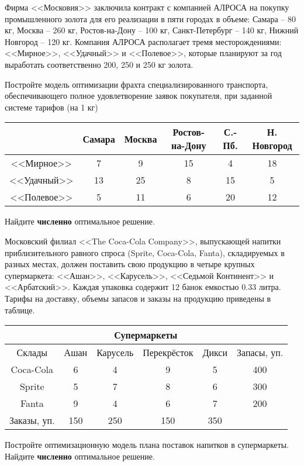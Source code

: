 \begin{exercise}%
Фирма <<Московия>> заключила контракт с компанией АЛРОСА на покупку
промышленного золота для его реализации в пяти городах в объеме:
Самара -- 80 кг, Москва -- 260 кг, Ростов-на-Дону -- 100 кг,
Санкт-Петербург -- 140 кг, Нижний Новгород -- 120 кг. Компания
АЛРОСА располагает тремя месторождениями: <<Мирное>>, <<Удачный>> и
<<Полевое>>, которые планируют за год выработать соответственно
200, 250 и 250 кг золота.

Постройте модель оптимизации фрахта специализированного транспорта,
обеспечивающего полное удовлетворение заявок покупателя, при
заданной системе тарифов (на 1 кг)
\begin{center}\small
	\begin{tabular}{|c|c|c|c|c|c|}
	\hline
	& Самара & Москва & Ростов-на-Дону & С.-Пб. & Н. Новгород \\ \hline
	<<Мирное>> & 7 & 9 & 15 & 4 & 18\\
	<<Удачный>> & 13 & 25 & 8 & 15 & 5 \\
	<<Полевое>> & 5 & 11 & 6 & 20 & 12\\
	\hline
	\end{tabular}
\end{center}
Найдите \textbf{численно} оптимальное решение.
\end{exercise}

\begin{exercise}
Московский филиал <<The Coca-Cola Company>>, выпускающей напитки
приблизительного равного спроса (Sprite, Coca-Cola, Fanta),
складируемых в разных местах, должен поставить свою продукцию в
четыре крупных супермаркета: <<Ашан>>, <<Карусель>>, <<Седьмой
Континент>> и <<Арбатский>>. Каждая упаковка содержит 12 банок
емкостью 0.33 литра. Тарифы на доставку, объемы запасов и заказы на
продукцию приведены в таблице.
\begin{center}\footnotesize
	\begin{tabular}{|c|c|c|c|c|c|}
	\hline
	& \multicolumn{4}{|c|}{Супермаркеты} & \\ \hline
	Склады & Ашан & Карусель & Перекрёсток& Дикси &
	Запасы, уп.
	\\ \hline
	Coca-Cola & 6 & 4 & 9 & 5 & 400 \\
	Sprite & 5 & 7 & 8 & 6 & 300 \\
	Fanta & 9 & 4 & 6 & 7 & 200 \\ \hline
	Заказы, уп. & 150 & 250 & 150 & 350 &  \\
	\hline
	\end{tabular}
\end{center}
Постройте оптимизационную модель плана поставок напитков в
супермаркеты. Найдите \textbf{численно} оптимальное решение.
\end{exercise}


